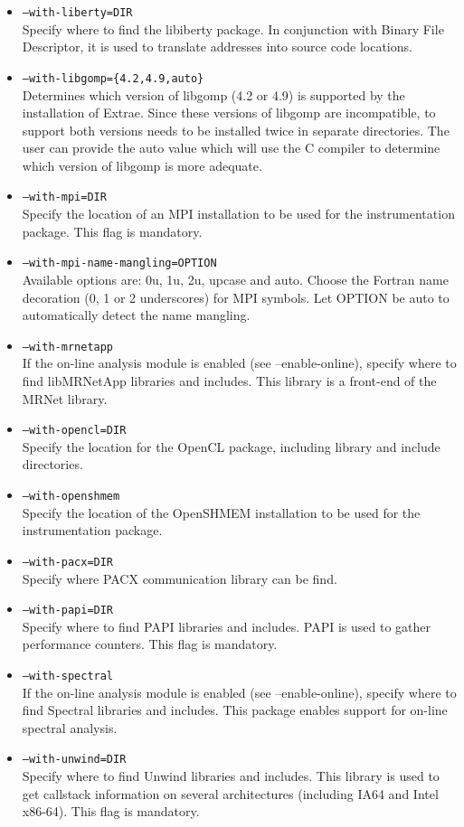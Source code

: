 \begin{itemize}
	\item {\tt --with-liberty=DIR} \\
	Specify where to find the libiberty package. In conjunction with Binary File Descriptor, it is used to translate addresses into source code locations.
	\item {\tt --with-libgomp=\{4.2,4.9,auto\}}\\
	Determines which version of libgomp (4.2 or 4.9) is supported by the installation of Extrae. Since these versions of libgomp are incompatible, to support both versions \TRACE needs to be installed twice in separate directories. The user can provide the auto value which will use the C compiler to determine which version of libgomp is more adequate.
	\item {\tt --with-mpi=DIR} \\
	Specify the location of an MPI installation to be used for the instrumentation package. This flag is mandatory.
	\item {\tt --with-mpi-name-mangling=OPTION} \\
	Available options are: 0u, 1u, 2u, upcase and auto. Choose the Fortran name decoration (0, 1 or 2 underscores) for MPI symbols. Let OPTION be auto to automatically detect the name mangling.
        \item {\tt --with-mrnetapp} \\
        If the on-line analysis module is enabled (see --enable-online), specify where to find libMRNetApp libraries and includes. This library is a front-end of the MRNet library. 
	\item {\tt --with-opencl=DIR} \\
	Specify the location for the OpenCL package, including library and include directories.
        \item {\tt --with-openshmem} \\
        Specify the location of the OpenSHMEM installation to be used for the instrumentation package. 
	\item {\tt --with-pacx=DIR} \\
	Specify where PACX communication library can be find.
	\item {\tt --with-papi=DIR} \\
	Specify where to find PAPI libraries and includes. PAPI is used to gather performance counters. This flag is mandatory.
        \item {\tt --with-spectral} \\
        If the on-line analysis module is enabled (see --enable-online), specify where to find Spectral libraries and includes. This package enables support for on-line spectral analysis.
	\item {\tt --with-unwind=DIR} \\
	Specify where to find Unwind libraries and includes. This library is used to get callstack information on several architectures (including IA64 and Intel x86-64). This flag is mandatory.
\end{itemize}


